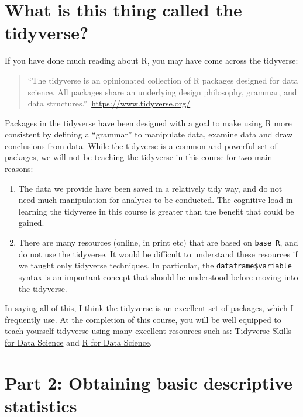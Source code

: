 \documentclass[
]{memoir}
\providecommand{\tightlist}{%
  \setlength{\itemsep}{0pt}\setlength{\parskip}{0pt}}
\begin{document}
\hypertarget{what-is-this-thing-called-the-tidyverse}{%
\section{What is this thing called the tidyverse?}\label{what-is-this-thing-called-the-tidyverse}}

If you have done much reading about R, you may have come across the tidyverse:

\begin{quote}
``The tidyverse is an opinionated collection of R packages designed for data science. All packages share an underlying design philosophy, grammar, and data structures.''~\url{https://www.tidyverse.org/}
\end{quote}

Packages in the tidyverse have been designed with a goal to make using R more consistent by defining a ``grammar'' to manipulate data, examine data and draw conclusions from data. While the tidyverse is a common and powerful set of packages, we will not be teaching the tidyverse in this course for two main reasons:

\begin{enumerate}
\def\labelenumi{\arabic{enumi}.}
\tightlist
\item
  The data we provide have been saved in a relatively tidy way, and do not need much manipulation for analyses to be conducted. The cognitive load in learning the tidyverse in this course is greater than the benefit that could be gained.
\item
  There are many resources (online, in print etc) that are based on \texttt{base\ R}, and do not use the tidyverse. It would be difficult to understand these resources if we taught only tidyverse techniques. In particular, the \texttt{dataframe\$variable} syntax is an important concept that should be understood before moving into the tidyverse.
\end{enumerate}

In saying all of this, I think the tidyverse is an excellent set of packages, which I frequently use. At the completion of this course, you will be well equipped to teach yourself tidyverse using many excellent resources such as: \href{https://jhudatascience.org/tidyversecourse/}{Tidyverse Skills for Data Science} and \href{https://r4ds.had.co.nz/}{R for Data Science}.

\hypertarget{part-2-obtaining-basic-descriptive-statistics}{%
\section*{Part 2: Obtaining basic descriptive statistics}\label{part-2-obtaining-basic-descriptive-statistics}}
\end{document}
